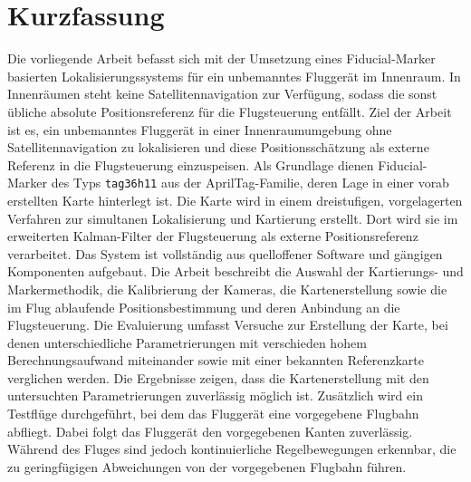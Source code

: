 \chapter*{Kurzfassung}
\noindent
Die vorliegende Arbeit befasst sich mit der Umsetzung eines Fiducial-Marker basierten Lokalisierungssystems für ein unbemanntes Fluggerät im Innenraum.
In Innenräumen steht keine Satellitennavigation zur Verfügung, sodass die sonst übliche absolute Positionsreferenz für die Flugsteuerung entfällt.
Ziel der Arbeit ist es, ein unbemanntes Fluggerät in einer Innenraumumgebung ohne Satellitennavigation zu lokalisieren und diese Positionsschätzung 
als externe Referenz in die Flugsteuerung einzuspeisen.
Als Grundlage dienen Fiducial-Marker des Typs \texttt{tag36h11} aus der AprilTag-Familie, deren Lage in einer vorab erstellten Karte hinterlegt ist.
Die Karte wird in einem dreistufigen, vorgelagerten Verfahren zur simultanen Lokalisierung und Kartierung erstellt.
Dort wird sie im erweiterten Kalman-Filter der Flugsteuerung als externe Positionsreferenz verarbeitet.
Das System ist vollständig aus quelloffener Software und gängigen Komponenten aufgebaut.
Die Arbeit beschreibt die Auswahl der Kartierungs- und Markermethodik, die Kalibrierung der Kameras, die Kartenerstellung sowie die im Flug ablaufende Positionsbestimmung und deren Anbindung an die Flugsteuerung.
Die Evaluierung umfasst Versuche zur Erstellung der Karte, bei denen unterschiedliche Parametrierungen mit verschieden hohem Berechnungsaufwand miteinander sowie mit einer bekannten Referenzkarte verglichen werden.
Die Ergebnisse zeigen, dass die Kartenerstellung mit den untersuchten Parametrierungen zuverlässig möglich ist.
Zusätzlich wird ein Testflüge durchgeführt, bei dem das Fluggerät eine vorgegebene Flugbahn abfliegt.
Dabei folgt das Fluggerät den vorgegebenen Kanten zuverlässig.
Während des Fluges sind jedoch kontinuierliche Regelbewegungen erkennbar, die zu geringfügigen Abweichungen von der vorgegebenen Flugbahn führen.